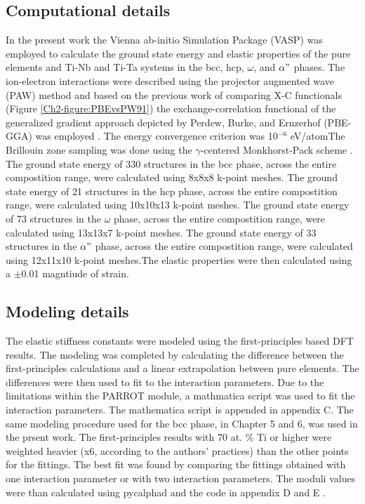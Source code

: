 \subsection{Computational details}

In the present work the Vienna ab-initio Simulation Package (VASP) \cite{Kresse1996} was employed to calculate the ground state energy and elastic properties of the pure elements and Ti-Nb and Ti-Ta systems in the bcc, hcp, $\omega$, and $\alpha"$ phases. The ion-electron interactions were described using the projector augmented wave (PAW) \cite{Kresse1999,Blochl1994} method and based on the previous work of comparing X-C functionals (Figure \ref{Ch2-figure:PBEvsPW91}) the exchange-correlation functional of the generalized gradient approach depicted by Perdew, Burke, and Ernzerhof (PBE-GGA) was employed \cite{Perdew1996a}. The energy convergence criterion was 10$^{-6}$ eV/atomThe Brillouin zone sampling was done using the $\gamma$-centered Monkhorst-Pack scheme \cite{Monkhorst1976a}. The ground state energy of 330 structures in the bcc phase, across the entire compostition range, were calculated using 8x8x8 k-point meshes. The ground state energy of 21 structures in the hcp phase, across the entire compostition range, were calculated using 10x10x13 k-point meshes. The ground state energy of 73 structures in the $\omega$ phase, across the entire compostition range, were calculated using 13x13x7 k-point meshes. The ground state energy of 33 structures in the $\alpha"$ phase, across the entire compostition range, were calculated using 12x11x10 k-point meshes.The elastic properties were then calculated using a $\pm$0.01 magntiude of strain.

\subsection{Modeling details}

The elastic stiffness constants were modeled using the first-principles based DFT results. The modeling was completed by calculating the difference between the first-principles calculations and a linear extrapolation between pure elements. The differences were then used to fit to the interaction parameters. Due to the limitations within the PARROT module, a mathmatica script was used to fit the interaction parameters. The mathematica script is appended in appendix C. The same modeling procedure used for the bcc phase, in Chapter 5 and 6, was used in the prsent work. The first-principles results with 70 at. \% Ti or higher were weighted heavier (x6, according to the authors' practices) than the other points for the fittings. The best fit was found by comparing the fittings obtained with one interaction parameter or with two interaction parameters. The moduli values were than calculated using pycalphad and the code in appendix D and E \cite{Otis2017}.

